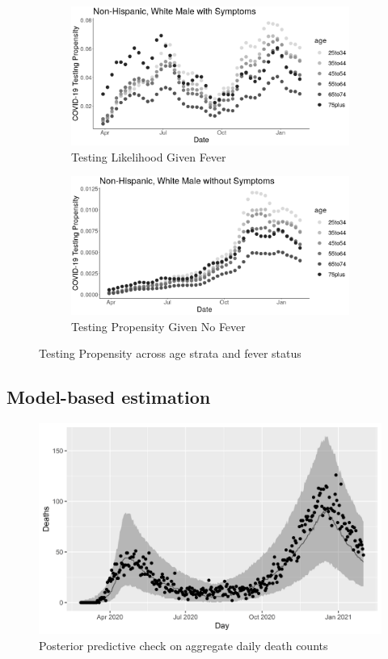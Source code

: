 \documentclass[11pt]{amsart}
\numberwithin{equation}{section}
\theoremstyle{plain}
\begin{document}
\begin{figure}[!th]
\centering
\begin{subfigure}{.5\textwidth}
 \centering
 \includegraphics[width=.9\linewidth]{../figs/tvprop_alt_fig1_mainpaper.png}
 \caption{Testing Likelihood Given Fever}
 \label{fig:testinglik1_mainpaper}
\end{subfigure}%
\begin{subfigure}{.5\textwidth}
 \centering
\includegraphics[width=.9\linewidth]{../figs/tvprop_alt_fig2_mainpaper.png}
 \caption{Testing Propensity Given No Fever}
 \label{fig:testinglik2_mainpaper}
\end{subfigure}
\caption{Testing Propensity across age strata and fever status}
\label{fig:testinglik_mainpaper}
\end{figure}




\subsection{Model-based estimation}


\begin{figure}[!th]
\centering
\includegraphics[width=.6\linewidth]{../figs/deaths_ppc.png}
\caption{Posterior predictive check on aggregate daily death counts}
\label{fig:deathsppc}
\end{figure}
\end{document}
